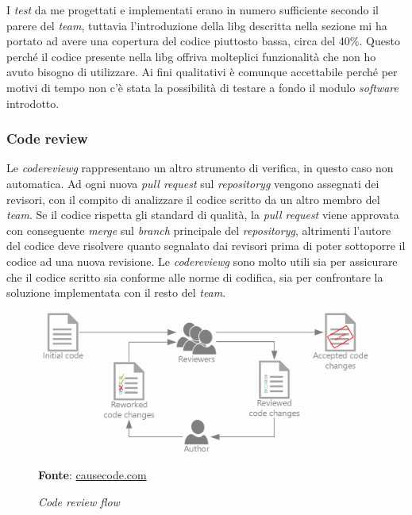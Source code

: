 I \textit{test} da me progettati e implementati erano in numero sufficiente secondo il parere del \textit{team}, tuttavia l'introduzione della \gls{libg} descritta nella sezione  mi ha portato ad avere una copertura del codice piuttosto bassa, circa del 40\%. Questo perché il codice presente nella \gls{libg} offriva molteplici funzionalità che non ho avuto bisogno di utilizzare. Ai fini qualitativi è comunque accettabile perché per motivi di tempo non c'è stata la possibilità di testare a fondo il modulo \textit{software} introdotto.

\subsubsection{Code review}
Le \textit{\gls{codereviewg}} rappresentano un altro strumento di verifica, in questo caso non automatica. Ad ogni nuova \textit{pull request} sul \textit{\gls{repositoryg}} vengono assegnati dei revisori, con il compito di analizzare il codice scritto da un altro membro del \textit{team}. Se il codice rispetta gli standard di qualità, la \textit{pull request} viene approvata con conseguente \textit{merge} sul \textit{branch} principale del \textit{\gls{repositoryg}}, altrimenti l'autore del codice deve risolvere quanto segnalato dai revisori prima di poter sottoporre il codice ad una nuova revisione. Le \textit{\gls{codereviewg}} sono molto utili sia per assicurare che il codice scritto sia conforme alle norme di codifica, sia per confrontare la soluzione implementata con il resto del \textit{team}.

    \begin{figure}[ht]
        \centering
        \includegraphics[width=1\textwidth]{immagini/code_review.png}
        \caption{\textit{Code review flow}}
        \textbf{Fonte}:
        \href{https://storage.googleapis.com/causecode-wordpress-media/2019/01/97795825-code-review-process-1024x429.png}{causecode.com}
        \label{fig: Code review flow}
    \end{figure}

